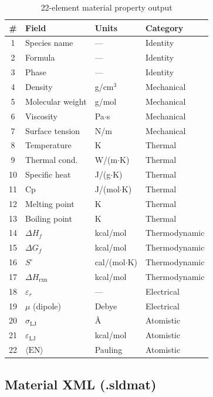 \documentclass[11pt,a4paper]{article}
\begin{document}
\begin{table}[h]
\centering
\caption{22-element material property output}
\label{tab:cfd}
\begin{tabular}{@{}clll@{}}
\toprule
\# & Field & Units & Category \\
\midrule
1  & Species name      & ---          & Identity \\
2  & Formula           & ---          & Identity \\
3  & Phase             & ---          & Identity \\
4  & Density           & g/cm$^3$    & Mechanical \\
5  & Molecular weight  & g/mol       & Mechanical \\
6  & Viscosity         & Pa$\cdot$s  & Mechanical \\
7  & Surface tension   & N/m         & Mechanical \\
8  & Temperature       & K           & Thermal \\
9  & Thermal cond.     & W/(m$\cdot$K) & Thermal \\
10 & Specific heat     & J/(g$\cdot$K) & Thermal \\
11 & Cp                & J/(mol$\cdot$K) & Thermal \\
12 & Melting point     & K           & Thermal \\
13 & Boiling point     & K           & Thermal \\
14 & $\Delta H_f$      & kcal/mol    & Thermodynamic \\
15 & $\Delta G_f$      & kcal/mol    & Thermodynamic \\
16 & $S^\circ$         & cal/(mol$\cdot$K) & Thermodynamic \\
17 & $\Delta H_\text{rxn}$ & kcal/mol & Thermodynamic \\
18 & $\varepsilon_r$   & ---         & Electrical \\
19 & $\mu$ (dipole)    & Debye       & Electrical \\
20 & $\sigma_\text{LJ}$ & \AA        & Atomistic \\
21 & $\varepsilon_\text{LJ}$ & kcal/mol & Atomistic \\
22 & $\langle\text{EN}\rangle$ & Pauling & Atomistic \\
\bottomrule
\end{tabular}
\end{table}

\subsection{Material XML (.sldmat)}
\end{document}
